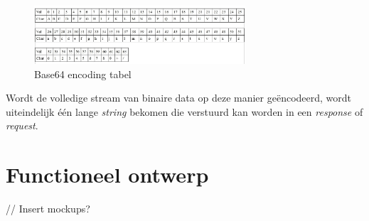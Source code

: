 \begin{figure}[H]
	\centering
	\includegraphics[width=0.7\textwidth]{Figuren/Base64EncodingTable.jpg}
	\caption{Base64 encoding tabel \cite{Base64Image}}
	\label{fig:Base64Table}
\end{figure} 

Wordt de volledige stream van binaire data op deze manier ge\"{e}ncodeerd, wordt uiteindelijk \'{e}\'{e}n lange \textit{string} bekomen die verstuurd kan worden in een \textit{response} of \textit{request}.

\newpage
\section{Functioneel ontwerp}
// Insert mockups?
\newpage






